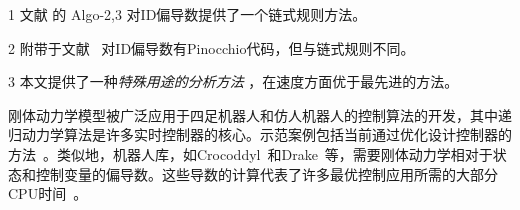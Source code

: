 \documentclass[letterpaper, 10 pt, conference]{ieeetran}  %
\begin{document}
 \begin{table}[h]
   \centering
  \begin{threeparttable}[b]
    \caption{计算刚体机体动力学偏导数的方法概要。}
    \vspace{-3pt}
    \label{table1}
 \begin{tablenotes}
    \item[1] 文献 \cite{car} 的 Algo-2,3 对ID偏导数提供了一个链式规则方法。
    \item[2] 附带于文献~\cite{car} 对ID偏导数有Pinocchio代码，但与链式规则不同。
    \item[3] 本文提供了一种{\it 特殊用途的分析方法} ，在速度方面优于最先进的方法。
  \end{tablenotes}    
 \end{threeparttable}
\end{table}

刚体动力学模型被广泛应用于四足机器人和仿人机器人的控制算法的开发，其中递归动力学算法是许多实时控制器的核心。示范案例包括当前通过优化设计控制器的方法~\cite{neunert,posa}。类似地，机器人库，如Crocoddyl~\cite{crocoddyl}和Drake~\cite{drake}等，需要刚体动力学相对于状态和控制变量的偏导数。这些导数的计算代表了许多最优控制应用所需的大部分CPU时间~\cite{car}。
\end{document}
